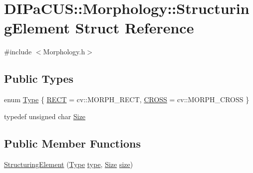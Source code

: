 \hypertarget{structDIPaCUS_1_1Morphology_1_1StructuringElement}{}\section{D\+I\+Pa\+C\+US\+:\+:Morphology\+:\+:Structuring\+Element Struct Reference}
\label{structDIPaCUS_1_1Morphology_1_1StructuringElement}


{\ttfamily \#include $<$Morphology.\+h$>$}

\subsection*{Public Types}
\begin{DoxyCompactItemize}
\item 
enum \mbox{\hyperlink{structDIPaCUS_1_1Morphology_1_1StructuringElement_a266d1fadc80f8b6ead0b9a38046db1a9}{Type}} \{ \mbox{\hyperlink{structDIPaCUS_1_1Morphology_1_1StructuringElement_a266d1fadc80f8b6ead0b9a38046db1a9a7d76512707b30d60a60d7a4e4aebab6b}{R\+E\+CT}} = cv\+:\+:M\+O\+R\+P\+H\+\_\+\+R\+E\+CT, 
\mbox{\hyperlink{structDIPaCUS_1_1Morphology_1_1StructuringElement_a266d1fadc80f8b6ead0b9a38046db1a9aa3ab6a623692ce64ea4c9abe4dfb0844}{C\+R\+O\+SS}} = cv\+:\+:M\+O\+R\+P\+H\+\_\+\+C\+R\+O\+SS
 \}
\item 
typedef unsigned char \mbox{\hyperlink{structDIPaCUS_1_1Morphology_1_1StructuringElement_ab516593fb61afbb06be48f756af85b56}{Size}}
\end{DoxyCompactItemize}
\subsection*{Public Member Functions}
\begin{DoxyCompactItemize}
\item 
\mbox{\hyperlink{structDIPaCUS_1_1Morphology_1_1StructuringElement_a0b76aaa0928ac88005e6168270170db2}{Structuring\+Element}} (\mbox{\hyperlink{structDIPaCUS_1_1Morphology_1_1StructuringElement_a266d1fadc80f8b6ead0b9a38046db1a9}{Type}} \mbox{\hyperlink{structDIPaCUS_1_1Morphology_1_1StructuringElement_aea9961571fdde31c048b2b1bd59f296a}{type}}, \mbox{\hyperlink{structDIPaCUS_1_1Morphology_1_1StructuringElement_ab516593fb61afbb06be48f756af85b56}{Size}} \mbox{\hyperlink{structDIPaCUS_1_1Morphology_1_1StructuringElement_ade1c5c9095630d3f404a75b97f1ae825}{size}})
\end{DoxyCompactItemize}
